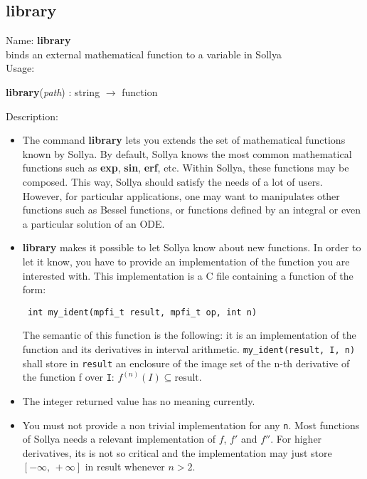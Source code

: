 \subsection{library}
\label{lablibrary}
\noindent Name: \textbf{library}\\
binds an external mathematical function to a variable in Sollya\\

\noindent Usage: 
\begin{center}
\textbf{library}(\emph{path}) : \textsf{string} $\rightarrow$ \textsf{function}\\
\end{center}
\noindent Description: \begin{itemize}

\item The command \textbf{library} lets you extends the set of mathematical
   functions known by Sollya.
   By default, Sollya knows the most common mathematical functions such
   as \textbf{exp}, \textbf{sin}, \textbf{erf}, etc. Within Sollya, these functions may be
   composed. This way, Sollya should satisfy the needs of a lot of
   users. However, for particular applications, one may want to
   manipulates other functions such as Bessel functions, or functions
   defined by an integral or even a particular solution of an ODE.

\item \textbf{library} makes it possible to let Sollya know about new functions. In
   order to let it know, you have to provide an implementation of the
   function you are interested with. This implementation is a C file containing
   a function of the form:
   \begin{verbatim} int my_ident(mpfi_t result, mpfi_t op, int n)\end{verbatim}
   The semantic of this function is the following: it is an implementation of
   the function and its derivatives in interval arithmetic.
   \verb|my_ident(result, I, n)| shall store in \verb|result| an enclosure 
   of the image set of the n-th derivative
   of the function f over \verb|I|: $f^{(n)}(I) \subseteq \mathrm{result}$.

\item The integer returned value has no meaning currently.

\item You must not provide a non trivial implementation for any \verb|n|. Most functions
   of Sollya needs a relevant implementation of $f$, $f'$ and $f''$. For higher 
   derivatives, its is not so critical and the implementation may just store 
   $[-\infty,\,+\infty]$ in result whenever $n>2$.


\end{itemize}
